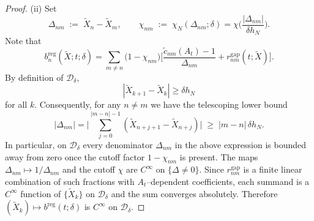 \documentclass[10pt,a4paper]{amsart}
\begin{document}
\begin{proof}
(ii) Set
\begin{equation}
\Delta_{nm}\;:=\;\widetilde X_n-\widetilde X_m,\qquad
\chi_{nm}\;:=\;\chi_N(\Delta_{nm};\delta)
=\chi\!\Big(\frac{|\Delta_{nm}|}{\delta h_N}\Big).
\end{equation}
Note that
\begin{equation}
b^{\mathrm{reg}}_{n}(\widetilde X;t;\delta)
=\sum_{m\neq n}\Big(1-\chi_{nm}\Big)\Bigg[
      \frac{\widetilde c_{nm}(A_t)-1}{\Delta_{nm}}
      + r^{\mathrm{gap}}_{nm}(t;\widetilde X)\Bigg].
\end{equation}
By definition of $\mathcal D_\delta$,
\begin{equation} 
|\widetilde X_{k+1}-\widetilde X_k|\ge \delta h_N
\end{equation} for all $k$. Consequently, for any $n\neq m$ we have the telescoping lower bound
\begin{equation}\label{eq:LB-j}
|\Delta_{nm}|
=\Big|\sum_{j=0}^{|m-n|-1}
(\widetilde X_{n+j+1}-\widetilde X_{n+j})\Big|
\;\ge\; |m-n|\,\delta h_N .
\end{equation}
In particular, on $\mathcal D_\delta$ every denominator
$\Delta_{nm}$ in the above expression is bounded away from zero once the cutoff factor $1-\chi_{nm}$ is present.
The maps $\Delta_{nm} \mapsto 1/\Delta_{nm}$ and the cutoff $\chi$ are $C^\infty$ on $\{\Delta\neq0\}$.
Since $r^{\mathrm{gap}}_{nm}$ is a finite linear combination of such
fractions with $A_t$–dependent coefficients,
each summand is a $C^\infty$ function of $\{\widetilde X_k\}$ on
$\mathcal D_\delta$ and the sum converges absolutely. Therefore $(\widetilde X_k)\mapsto b^{\mathrm{reg}}(t;\delta)$
is $C^\infty$ on $\mathcal D_\delta$.



\end{proof}
\end{document}

